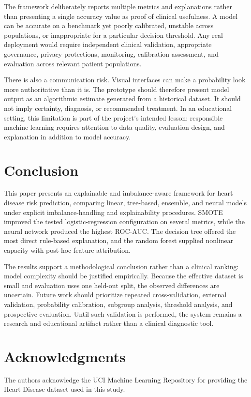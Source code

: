 \documentclass[10pt]{article}
\begin{document}
The framework deliberately reports multiple metrics and explanations rather than presenting a single accuracy value as proof of clinical usefulness. A model can be accurate on a benchmark yet poorly calibrated, unstable across populations, or inappropriate for a particular decision threshold. Any real deployment would require independent clinical validation, appropriate governance, privacy protections, monitoring, calibration assessment, and evaluation across relevant patient populations.

There is also a communication risk. Visual interfaces can make a probability look more authoritative than it is. The prototype should therefore present model output as an algorithmic estimate generated from a historical dataset. It should not imply certainty, diagnosis, or recommended treatment. In an educational setting, this limitation is part of the project's intended lesson: responsible machine learning requires attention to data quality, evaluation design, and explanation in addition to model accuracy.

\section{Conclusion}
This paper presents an explainable and imbalance-aware framework for heart disease risk prediction, comparing linear, tree-based, ensemble, and neural models under explicit imbalance-handling and explainability procedures. SMOTE improved the tested logistic-regression configuration on several metrics, while the neural network produced the highest ROC-AUC. The decision tree offered the most direct rule-based explanation, and the random forest supplied nonlinear capacity with post-hoc feature attribution.

The results support a methodological conclusion rather than a clinical ranking: model complexity should be justified empirically. Because the effective dataset is small and evaluation uses one held-out split, the observed differences are uncertain. Future work should prioritize repeated cross-validation, external validation, probability calibration, subgroup analysis, threshold analysis, and prospective evaluation. Until such validation is performed, the system remains a research and educational artifact rather than a clinical diagnostic tool.

\section*{Acknowledgments}
The authors acknowledge the UCI Machine Learning Repository for providing the Heart Disease dataset used in this study.
\end{document}

